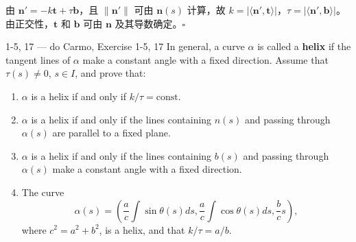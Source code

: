 \begin{solution}
由 $\mathbf{n}' = -k\mathbf{t} + \tau\mathbf{b}$，且 $\|\mathbf{n}'\|$ 可由 $\mathbf{n}(s)$ 计算，故 $k = |\langle\mathbf{n}', \mathbf{t}\rangle|$，$\tau = |\langle\mathbf{n}', \mathbf{b}\rangle|$。由正交性，$\mathbf{t}$ 和 $\mathbf{b}$ 可由 $\mathbf{n}$ 及其导数确定。$\square$
\end{solution}

\begin{exercise}{1-5, 17 — do Carmo, Exercise 1-5, 17}
In general, a curve $\alpha$ is called a \textbf{helix} if the tangent lines of $\alpha$ make a constant angle with a fixed direction. Assume that $\tau(s) \neq 0$, $s \in I$, and prove that:
\begin{enumerate}
\item[a.] $\alpha$ is a helix if and only if $k/\tau = \mathrm{const}$.
\item[b.] $\alpha$ is a helix if and only if the lines containing $n(s)$ and passing through $\alpha(s)$ are parallel to a fixed plane.
\item[c.*] $\alpha$ is a helix if and only if the lines containing $b(s)$ and passing through $\alpha(s)$ make a constant angle with a fixed direction.
\item[d.] The curve
\[
\alpha(s) = \left(\frac{a}{c}\int\sin\theta(s) ds, \frac{a}{c}\int\cos\theta(s) ds, \frac{b}{c}s\right),
\]
where $c^2 = a^2 + b^2$, is a helix, and that $k/\tau = a/b$.
\end{enumerate}
\end{exercise}

